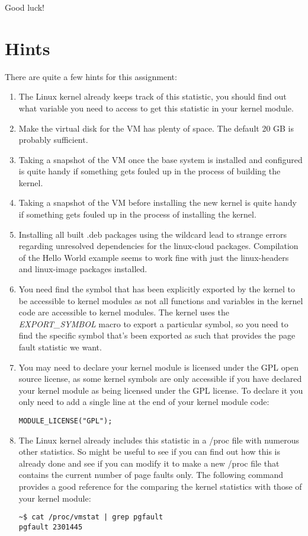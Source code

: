 \documentclass[11pt]{article}
\begin{document}
Good luck!

\section*{Hints}

There are quite a few hints for this assignment:

\begin{enumerate}
\item The Linux kernel already keeps track of this statistic, you should find out what variable you need to access to get this statistic in your kernel module.
\item Make the virtual disk for the VM has plenty of space. The default 20 GB is probably sufficient. 
\item Taking a snapshot of the VM once the base system is installed and configured is quite handy if something gets fouled up in the process of building the kernel.
\item Taking a snapshot of the VM before installing the new kernel is quite handy if something gets fouled up in the process of installing the kernel.
\item Installing all built .deb packages using the wildcard lead to strange errors regarding unresolved dependencies for the linux-cloud packages. Compilation of the Hello World example seems to work fine with just the linux-headers and linux-image packages installed.
\item You need find the symbol that has been explicitly exported by the kernel to be accessible to kernel modules as not all functions and variables in the kernel code are accessible to kernel modules. The kernel uses the \emph{EXPORT\_SYMBOL} macro to export a particular symbol, so you need to find the specific symbol that's been exported as such that provides the page fault statistic we want.
\item You may need to declare your kernel module is licensed under the GPL open source license, as some kernel symbols are only accessible if you have declared your kernel module as being licensed under the GPL license. To declare it you only need to add a single line at the end of your kernel module code\cite{gpl}:

\begin{verbatim}
MODULE_LICENSE("GPL");
\end{verbatim}

\item The Linux kernel already includes this statistic in a /proc file with numerous other statistics. So might be useful to see if you can find out how this is already done and see if you can modify it to make a new /proc file that contains the current number of page faults only. The following command provides a good reference for the comparing the kernel statistics with those of your kernel module:

\begin{verbatim}
~$ cat /proc/vmstat | grep pgfault
pgfault 2301445
\end{verbatim}
\end{enumerate}
\end{document}

